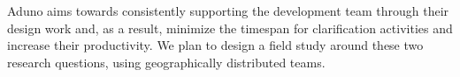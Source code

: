 \documentclass[conference]{IEEEtran}
\begin{document}
Aduno aims towards consistently supporting the development team through their design work and, as a result, minimize the timespan for clarification activities and increase their productivity. We plan to design a field study around these two research questions, using geographically distributed teams. 


 

\end{document}
